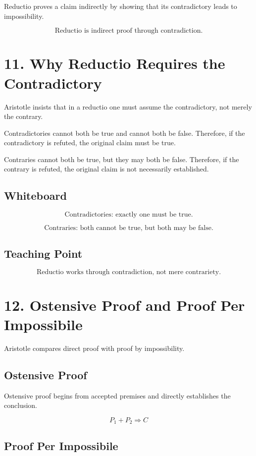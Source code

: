 \documentclass[12pt]{article}
\begin{document}
Reductio proves a claim indirectly by showing that its contradictory leads to
impossibility.

\[
\boxed{
\text{Reductio is indirect proof through contradiction.}
}
\]

\section*{11. Why Reductio Requires the Contradictory}

Aristotle insists that in a reductio one must assume the contradictory, not
merely the contrary.

Contradictories cannot both be true and cannot both be false. Therefore, if the
contradictory is refuted, the original claim must be true.

Contraries cannot both be true, but they may both be false. Therefore, if the
contrary is refuted, the original claim is not necessarily established.

\subsection*{Whiteboard}

\[
\text{Contradictories: exactly one must be true.}
\]

\[
\text{Contraries: both cannot be true, but both may be false.}
\]

\subsection*{Teaching Point}

\[
\boxed{
\text{Reductio works through contradiction, not mere contrariety.}
}
\]

\section*{12. Ostensive Proof and Proof Per Impossibile}

Aristotle compares direct proof with proof by impossibility.

\subsection*{Ostensive Proof}

Ostensive proof begins from accepted premises and directly establishes the
conclusion.

\[
P_1 + P_2 \Rightarrow C
\]

\subsection*{Proof Per Impossibile}
\end{document}
